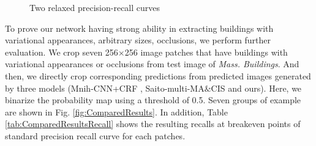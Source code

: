\documentclass[runningheads]{llncs}
\begin{document}
\begin{figure}
\centering
{}
\caption{Two relaxed precision-recall curves}
\label{fig:}
\end{figure}
 
  To prove our network having strong ability in extracting buildings with variational appearances, arbitrary sizes, occlusions, we perform  further evaluation. We crop seven 256$\times$256 image patches that have buildings with variational appearances or occlusions from test image of \textit{Mass. Buildings}. And then, we directly crop corresponding predictions from predicted images  generated by three models (Mnih-CNN+CRF \cite{Mnih2013Machine}, Saito-multi-MA$\&$CIS \cite{Saito2016Multiple} and ours). Here, we binarize the probability map using a threshold of 0.5. Seven groups of example are shown in Fig. \ref{fig:ComparedResults}. In addition, Table \ref{tab:ComparedResultsRecall} shows the resulting recalls at breakeven points of standard precision recall curve for each patches. 
  
\end{document}
